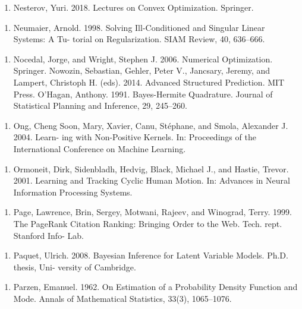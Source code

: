 \begin{enumerate}
\item Nesterov, Yuri. 2018. Lectures on Convex Optimization. Springer.
\end{enumerate}

\begin{enumerate}
\item Neumaier, Arnold. 1998. Solving Ill-Conditioned and Singular Linear Systems: A Tu- torial on Regularization. SIAM Review, 40, 636–666.
\end{enumerate}

\begin{enumerate}
\item Nocedal, Jorge, and Wright, Stephen J. 2006. Numerical Optimization. Springer. Nowozin, Sebastian, Gehler, Peter V., Jancsary, Jeremy, and Lampert, Christoph H. (eds). 2014. Advanced Structured Prediction. MIT Press. O’Hagan, Anthony. 1991. Bayes-Hermite Quadrature. Journal of Statistical Planning and Inference, 29, 245–260.
\end{enumerate}

\begin{enumerate}
\item Ong, Cheng Soon, Mary, Xavier, Canu, Stéphane, and Smola, Alexander J. 2004. Learn- ing with Non-Positive Kernels. In: Proceedings of the International Conference on Machine Learning.
\end{enumerate}

\begin{enumerate}
\item Ormoneit, Dirk, Sidenbladh, Hedvig, Black, Michael J., and Hastie, Trevor. 2001. Learning and Tracking Cyclic Human Motion. In: Advances in Neural Information Processing Systems.
\end{enumerate}

\begin{enumerate}
\item Page, Lawrence, Brin, Sergey, Motwani, Rajeev, and Winograd, Terry. 1999. The PageRank Citation Ranking: Bringing Order to the Web. Tech. rept. Stanford Info- Lab.
\end{enumerate}

\begin{enumerate}
\item Paquet, Ulrich. 2008. Bayesian Inference for Latent Variable Models. Ph.D. thesis, Uni- versity of Cambridge.
\end{enumerate}

\begin{enumerate}
\item Parzen, Emanuel. 1962. On Estimation of a Probability Density Function and Mode. Annals of Mathematical Statistics, 33(3), 1065–1076.
\end{enumerate}

